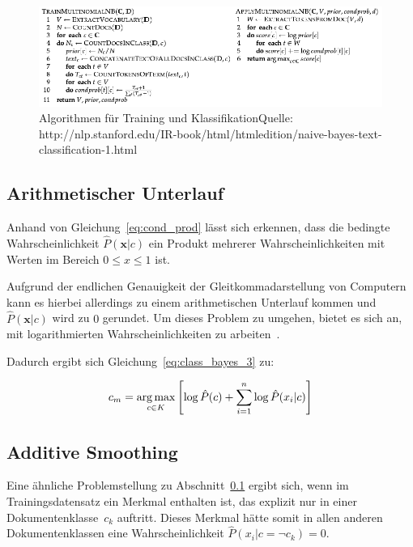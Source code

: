         \begin{figure}[htpb]
            \centering
            \includegraphics[scale=0.5]{images/algo2.png}
            \caption{Algorithmen für Training und Klassifikation\newline\tiny{Quelle: http://nlp.stanford.edu/IR-book/html/htmledition/naive-bayes-text-classification-1.html}}\label{fig:algo}
        \end{figure}

    \subsection{Arithmetischer Unterlauf}\label{sec:log}
    Anhand von Gleichung~\ref{eq:cond_prod} lässt sich erkennen, dass die bedingte Wahrscheinlichkeit $\hat{P}(\mathbf{x}|c)$ ein Produkt mehrerer Wahrscheinlichkeiten mit Werten im Bereich $0 \le x \le 1$ ist.

    Aufgrund der endlichen Genauigkeit der Gleitkommadarstellung von Computern kann es hierbei allerdings zu einem arithmetischen Unterlauf kommen und $\hat{P}(\mathbf{x}|c)$ wird zu $0$ gerundet. Um dieses Problem zu umgehen, bietet es sich an, mit logarithmierten Wahrscheinlichkeiten zu arbeiten~\cite{IIR}.
        
        Dadurch ergibt sich Gleichung~\ref{eq:class_bayes_3} zu:

        \begin{equation}
            c_{m} = \operatorname*{arg\,max}_{c \in K}\left[\log{\hat{P}(c)} + \sum_{i=1}^{n}\log{\hat{P}(x_{i}|c)}\right]
            \label{eq:log_bayes}
        \end{equation}

    \subsection{Additive Smoothing}
    Eine ähnliche Problemstellung zu Abschnitt~\ref{sec:log} ergibt sich, wenn im Trainingsdatensatz ein Merkmal enthalten ist, das explizit nur in einer Dokumentenklasse~$c_{k}$ auftritt. Dieses Merkmal hätte somit in allen anderen Dokumentenklassen eine Wahrscheinlichkeit $\hat{P}(x_{i}|c = \neg c_{k}) = 0$.

